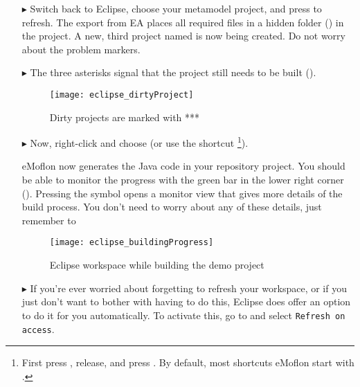 \begin{itemize}
\item[$\blacktriangleright$] Switch back to Eclipse, choose your metamodel project, and press  to refresh. 
The export from EA places all required files in a hidden folder () in the project.
A new, third project named  is now being created.
Do not worry about the problem markers.

\item[$\blacktriangleright$] The three asterisks signal that the project still needs to be built ().
%
\begin{figure}[htbp]
    \centering
    \texttt{[image: eclipse\_dirtyProject]}
    \caption{Dirty projects are marked with ***} 
    \label{eclipse:dirty-project} 
\end{figure}
%
\item[$\blacktriangleright$] Now, right-click  and choose  (or use the shortcut \footnote{First press , release, and press .
By default, most shortcuts eMoflon start with .}).

eMoflon now generates the Java code in your repository project.
You should be able to monitor the progress with the green bar in the lower right corner ().
Pressing the symbol opens a monitor view that gives more details of the build process. 
You don't need to worry about any of these details, just remember to 
%
\begin{figure}[htbp]
    \centering
    \texttt{[image: eclipse\_buildingProgress]}
    \caption{Eclipse workspace while building the demo project} 
    \label{eclipse:build} 
\end{figure}
%
\item[$\blacktriangleright$]
If you're ever worried about forgetting to refresh your workspace, or if you just don't want to bother with having to do this,
Eclipse does offer an option to do it for you automatically. To activate this, go to  and select \texttt{Refresh on access}.

\end{itemize}